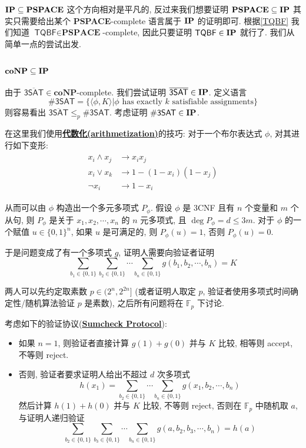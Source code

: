 \documentclass[8pt]{article}
\theoremstyle{compact}
\def\obj#1{\textbf{\uline{#1}}}
\def\le{\leqslant}
\def\coNP{\textbf{coNP}}
\def\PSPACE{\textbf{PSPACE}}
\begin{document}
$\IP \subseteq \PSPACE$ 这个方向相对是平凡的, 反过来我们想要证明 $\PSPACE \subseteq \IP$ 其实只需要给出某个 \PSPACE-complete 语言属于 $\textbf{IP}$ 的证明即可. 根据\cref{TQBF} 我们知道 $\textsf{TQBF} \in \PSPACE$-complete, 因此只要证明 $\textsf{TQBF} \in \textbf{IP}$ 就行了. 我们从简单一点的尝试出发. 

\subsubsection{$\coNP \subseteq \IP$}
由于 $\overline{\textsf{3SAT}} \in \coNP$-complete. 我们尝试证明 $\overline{\textsf{3SAT}} \in \textbf{IP}$. 定义语言 $$\textsf{\#3SAT} = \{\langle \phi, K \rangle | \phi \text{ has exactly } k \text{ satisfiable assignments}\}$$ 则容易看出 $\overline{\textsf{3SAT}} \le_p \textsf{\#3SAT}$. 考虑证明 $\textsf{\#3SAT} \in \textbf{IP}$.

在这里我们使用\obj{代数化(arithmetization)}的技巧: 对于一个布尔表达式 $\phi$, 对其进行如下变形: \begin{align*}
	\begin{split}
		x_i \wedge x_j & \rightarrow x_ix_j \\
		x_i \vee x_k & \rightarrow 1 - (1 - x_i)(1 - x_j) \\
		\lnot x_i & \rightarrow 1 - x_i
	\end{split}
\end{align*}

从而可以由 $\phi$ 构造出一个多元多项式 $P_{\phi}$. 假设 $\phi$ 是 3CNF 且有 $n$ 个变量和 $m$ 个从句, 则 $P_{\phi}$ 是关于 $x_1, x_2, \cdots, x_n$ 的 $n$ 元多项式, 且 $\deg P_{\phi} = d \le 3m$. 对于 $\phi$ 的一个赋值 $u \in \{0, 1\}^n$, 如果 $u$ 是可满足的, 则 $P_{\phi}(u) = 1$, 否则 $P_{\phi}(u) = 0$.

于是问题变成了有一个多项式 $g$, 证明人需要向验证者证明 $$\sum_{b_1 \in \{0, 1\}}\sum_{b_2 \in \{0, 1\}}\cdots \sum_{b_n \in \{0, 1\}}g(b_1, b_2, \cdots, b_n) = K$$

两人可以先约定取素数 $p \in (2^n, 2^{2n}]$ (或者证明人取定 $p$, 验证者使用多项式时间确定性/随机算法验证 $p$ 是素数), 之后所有问题将在 $\mathbb F_p$ 下讨论.

考虑如下的验证协议(\obj{Sumcheck Protocol}): \begin{itemize}
	\item 如果 $n = 1$, 则验证者直接计算 $g(1) + g(0)$ 并与 $K$ 比较, 相等则 accept, 不等则 reject.
 \item 否则, 验证者要求证明人给出不超过 $d$ 次多项式 $$h(x_1) = \sum_{b_2 \in \{0, 1\}}\cdots \sum_{b_n \in \{0, 1\}}g(x_1, b_2, \cdots, b_n)$$ 然后计算 $h(1) + h(0)$ 并与 $K$ 比较, 不等则 reject, 否则在 $\mathbb F_p$ 中随机取 $a$, 与证明人递归验证 $$\sum_{b_2 \in \{0, 1\}}\sum_{b_3 \in \{0, 1\}}\cdots \sum_{b_n \in \{0, 1\}}g(a, b_2, b_3, \cdots, b_n) = h(a)$$
\end{itemize}
\end{document}
